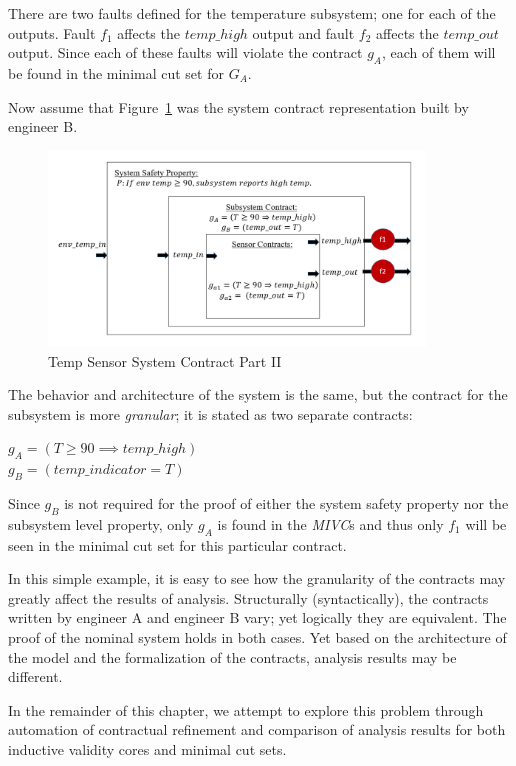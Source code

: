There are two faults defined for the temperature subsystem; one for each of the outputs. Fault $f_1$ affects the $temp\_high$ output and fault $f_2$ affects the $temp\_out$ output. Since each of these faults will violate the contract $g_A$, each of them will be found in the minimal cut set for $G_A$.

Now assume that Figure~\ref{fig:granularityEx2} was the system contract representation built by engineer B. 

\begin{figure}[h!]
\begin{center}
\includegraphics[width=10cm]{images/granularityEx2.PNG}
\caption{Temp Sensor System Contract Part II} \label{fig:granularityEx2}
\end{center}
\end{figure} 

The behavior and architecture of the system is the same, but the contract for the subsystem is more \textit{granular}; it is stated as two separate contracts:
\begin{center}
    $ g_A = (T \geq 90 \implies temp\_high)$ \\ 
    $ g_B = (temp\_indicator = T)$ 
\end{center}

Since $g_B$ is not required for the proof of either the system safety property nor the subsystem level property, only $g_A$ is found in the \textit{MIVC}s and thus only $f_1$ will be seen in the minimal cut set for this particular contract. 
 
In this simple example, it is easy to see how the granularity of the contracts may greatly affect the results of analysis. Structurally (syntactically), the contracts written by engineer A and engineer B vary; yet logically they are equivalent. The proof of the nominal system holds in both cases. Yet based on the architecture of the model and the formalization of the contracts, analysis results may be different. 

In the remainder of this chapter, we attempt to explore this problem through automation of contractual refinement and comparison of analysis results for both inductive validity cores and minimal cut sets. 